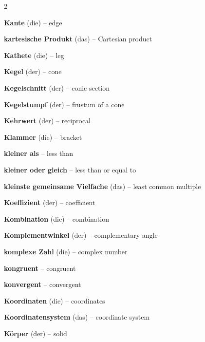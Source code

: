 \begin{multicols}{2}
\par\nopagebreak
\textbf{Kante} (die) -- edge\dotfill\hyperref[e:246]{\pageref*{e:246}}\par
\textbf{kartesische Produkt} (das) -- Cartesian product\dotfill\hyperref[e:103]{\pageref*{e:103}}\par
\textbf{Kathete} (die) -- leg\dotfill\hyperref[e:187]{\pageref*{e:187}}\par
\textbf{Kegel} (der) -- cone\dotfill\hyperref[e:231]{\pageref*{e:231}}\par
\textbf{Kegelschnitt} (der) -- conic section\dotfill\hyperref[e:312]{\pageref*{e:312}}\par
\textbf{Kegelstumpf} (der) -- frustum of a cone\dotfill\hyperref[e:236]{\pageref*{e:236}}\par
\textbf{Kehrwert} (der) -- reciprocal\dotfill\hyperref[e:39]{\pageref*{e:39}}\par
\textbf{Klammer} (die) -- bracket\dotfill\hyperref[e:87]{\pageref*{e:87}}\par
\textbf{kleiner als} -- less than\dotfill\hyperref[e:63]{\pageref*{e:63}}\par
\textbf{kleiner oder gleich} -- less than or equal to\dotfill\hyperref[e:65]{\pageref*{e:65}}\par
\textbf{kleinste gemeinsame Vielfache} (das) -- least common multiple\dotfill\hyperref[e:57]{\pageref*{e:57}}\par
\textbf{Koeffizient} (der) -- coefficient\dotfill\hyperref[e:74]{\pageref*{e:74}}\par
\textbf{Kombination} (die) -- combination\dotfill\hyperref[e:343]{\pageref*{e:343}}\par
\textbf{Komplementwinkel} (der) -- complementary angle\dotfill\hyperref[e:164]{\pageref*{e:164}}\par
\textbf{komplexe Zahl} (die) -- complex number\dotfill\hyperref[e:10]{\pageref*{e:10}}\par
\textbf{kongruent} -- congruent\dotfill\hyperref[e:175]{\pageref*{e:175}}\par
\textbf{konvergent} -- convergent\dotfill\hyperref[e:262]{\pageref*{e:262}}\par
\textbf{Koordinaten} (die) -- coordinates\dotfill\hyperref[e:116]{\pageref*{e:116}}\par
\textbf{Koordinatensystem} (das) -- coordinate system\dotfill\hyperref[e:113]{\pageref*{e:113}}\par
\textbf{Körper} (der) -- solid\dotfill\hyperref[e:225]{\pageref*{e:225}}\par

\end{multicols}
